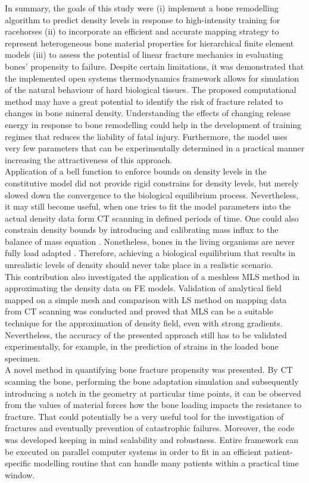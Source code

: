 \documentclass[11pt]{ACMEarticle}
\numberwithin{equation}{section}
\begin{document}
In summary, the goals of this study were (i) implement a bone remodelling algorithm to predict density levels in response to high-intensity training for racehorses (ii) to incorporate an efficient and accurate mapping strategy to represent heterogeneous bone material properties for hierarchical finite element models (iii) to assess the potential of linear fracture mechanics in evaluating bones' propensity to failure. Despite certain limitations, it was demonstrated that the implemented open systems thermodynamics framework allows for simulation of the natural behaviour of hard biological tissues. The proposed computational method may have a great potential to identify the risk of fracture related to changes in bone mineral density. Understanding the effects of changing release energy in response to bone remodelling could help in the development  of training regimes that reduces the liability of fatal injury. Furthermore, the model uses very few parameters that can be experimentally determined in a practical manner increasing the attractiveness of this approach.\\ 
Application of a bell function to enforce bounds on density levels in the constitutive model did not provide rigid constrains for density levels, but merely slowed down the convergence to the biological equilibrium process. Nevertheless, it may still become useful, when one tries to fit the model parameters into the actual density data form CT scanning in defined periods of time. One could also constrain density bounds by introducing and calibrating mass influx to the balance of mass equation \citep{sharma2013adaptive}. Nonetheless, bones in the living organisms are never fully load adapted \citep{christen2014bone}. Therefore, achieving a biological equilibrium that results in unrealistic levels of density should never take place in a realistic scenario. \\
This contribution also investigated the application of a meshless MLS method in approximating the density data on FE models. Validation of analytical field mapped on a simple mesh and comparison with LS method on mapping data from CT scanning was conducted and proved that MLS can be a suitable technique for the approximation of density field, even with strong gradients. Nevertheless, the accuracy of the presented approach still has to be validated experimentally, for example, in the prediction of strains in the loaded bone specimen.  \\
A novel method in quantifying bone fracture propensity was presented. By CT scanning the bone, performing the bone adaptation simulation and subsequently introducing a notch in the geometry at particular time points, it can be observed from the values of material forces how the bone loading impacts the resistance to fracture. That could potentially be a very useful tool for the investigation of fractures and eventually prevention of catastrophic failures. Moreover, the code was developed keeping in mind scalability and robustness. Entire framework can be executed on parallel computer systems in order to fit in an efficient patient-specific modelling routine that can handle many patients within a practical time window. \\
\end{document}

